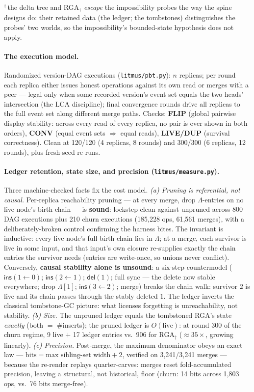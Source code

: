 \documentclass[11pt]{article}
\newcommand{\del}{\mathsf{del}}
\newcommand{\ins}{\mathsf{ins}}
\begin{document}
\noindent $^{\dagger}$\,the delta tree and RGA$_\dagger$ \emph{escape}
the impossibility probes the way the spine designs do: their retained data
(the ledger; the tombstones) distinguishes the probes' two worlds, so the
impossibility's bounded-state hypothesis does not apply.

\paragraph{The execution model.} Randomized version-DAG executions
(\texttt{litmus/pbt.py}): $n$ replicas; per round each replica either
issues honest operations against its own read or merges with a peer ---
legal only when some recorded version's event set equals the two heads'
intersection (the LCA discipline); final convergence rounds drive all
replicas to the full event set along different merge paths. Checks:
\textbf{FLIP} (global pairwise display stability: across every read of
every replica, no pair is ever shown in both orders), \textbf{CONV}
(equal event sets $\Rightarrow$ equal reads), \textbf{LIVE/DUP} (survival
correctness). Clean at 120/120 (4 replicas, 8 rounds) and 300/300
(6 replicas, 12 rounds), plus fresh-seed re-runs.

\paragraph{Ledger retention, state size, and precision
(\texttt{litmus/measure.py}).} Three machine-checked facts fix the cost
model. \emph{(a) Pruning is referential, not causal.} Per-replica
reachability pruning --- at every merge, drop $\Lambda$-entries on no
live node's birth chain --- is \textbf{sound}: lockstep-clean against
unpruned across 800 DAG executions plus 210 churn executions (185{,}228
ops, 61{,}561 merges), with a deliberately-broken control confirming the
harness bites. The invariant is inductive: every live node's full birth
chain lies in $\Lambda$; at a merge, each survivor is live in some input,
and that input's own closure re-supplies exactly the chain entries the
survivor needs (entries are write-once, so unions never conflict).
Conversely, \textbf{causal stability alone is unsound}: a six-step
countermodel ($\ins(1{\leftarrow}0)$; $\ins(2{\leftarrow}1)$;
$\del(1)$; full sync --- the delete now stable everywhere; drop
$\Lambda[1]$; $\ins(3{\leftarrow}2)$; merge) breaks the chain
walk: survivor $2$ is live and its chain passes through the stably
deleted $1$. The ledger inverts the classical tombstone-GC picture: what
licenses forgetting is unreachability, not stability. \emph{(b) Size.}
The unpruned ledger equals the tombstoned RGA's state \emph{exactly}
(both $=$ \#inserts); the pruned ledger is $O(\mathrm{live})$: at round
300 of the churn regime, 9 live $+$ 17 ledger entries vs.\ 906 for
RGA$_\dagger$ ($\approx 35\times$, growing linearly). \emph{(c)
Precision.} Post-merge, the maximum denominator obeys an exact law ---
$\mathrm{bits} = \text{max sibling-set width} + 2$, verified on
3{,}241/3{,}241 merges --- because the re-render replays quarter-carves:
merges reset fold-accumulated precision, leaving a structural, not
historical, floor (churn: 14 bits across 1{,}803 ops, vs.\ 76 bits
merge-free).
\end{document}
